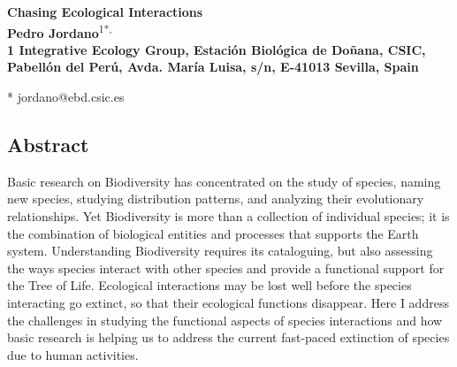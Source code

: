 \documentclass[10pt,letterpaper]{article}
\date{}
\begin{document}
\vspace*{0.35in}

\begin{flushleft}
{\Large
\textbf{Chasing Ecological Interactions}
}
\newline
\\
\textbf{Pedro Jordano}\textsuperscript{1*,\Yinyang}
\\
\bigskip
\bf{1} Integrative Ecology Group, Estaci\'on Biol\'ogica de 
Do\~nana, CSIC, Pabell\'on del Per\'u, Avda. Mar\'ia Luisa, s/n, 
E-41013 Sevilla, Spain
\\
\bigskip

% 

* jordano@ebd.csic.es

\end{flushleft}
%
\subsection*{Abstract}
Basic research on Biodiversity has concentrated on the study of species, naming new species, studying distribution patterns, and analyzing their evolutionary relationships. Yet Biodiversity is more than a collection of individual species; it is the combination of biological entities and processes that supports the Earth system. Understanding Biodiversity requires its cataloguing, but also assessing the ways species interact with other species and provide a functional support for the Tree of Life. Ecological interactions may be lost well before the species interacting go extinct, so that their ecological functions disappear. Here I address the challenges in studying the functional aspects of species interactions and how basic research is helping us to address the current fast-paced extinction of species due to human activities.
\end{document}

